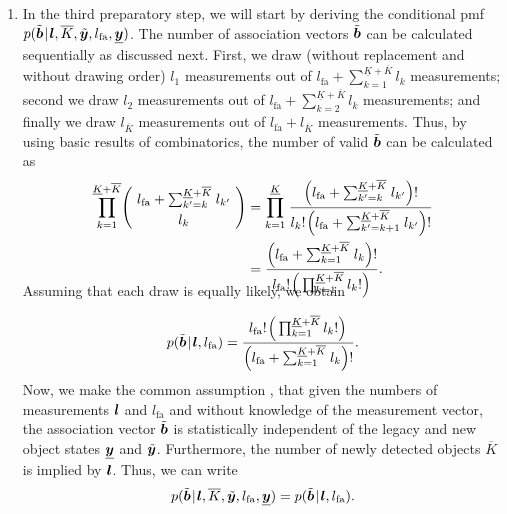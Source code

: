 \documentclass[11pt,a4paper]{article}
\newcommand{\ist}{\hspace*{.3mm}}
\newcommand{\rmv}{\hspace*{-.3mm}}
\newcommand{\nn}{\nonumber}
\begin{document}
\begin{enumerate}
\item In the third preparatory step, we will start by deriving the conditional pmf \vspace{0mm} $p( \tilde{\V{b}} \ist | \ist \V{l}, \overline{K}, \tilde{\V{y}}, l_{\mathrm{fa}},  \underline{\V{y}})$. The number of association vectors $\tilde{\bm{b}}$ can be calculated sequentially as discussed next. First, we draw (without replacement and without drawing order) $l_1$ measurements out of $ l_{\mathrm{fa}} + \sum^{\underline{K} + \overline{K}}_{k=1} l_{k}$ measurements; second we draw $l_2$ measurements out of $ l_{\mathrm{fa}} +  \sum^{\underline{K} + \overline{K}}_{k=2} l_{k}$ measurements; and finally we draw $l_{\overline{K}}$ measurements out of $l_{\mathrm{fa}} + l_{\overline{K}}$ measurements. Thus, by using basic results of combinatorics, the number of \vspace{-.5mm} valid $\tilde{\bm{b}}$ can be calculated as
\begin{align}
\prod^{\underline{K} + \overline{K}}_{k=1} \rmv\rmv \left(\!
    \begin{array}{c}
      l_{\mathrm{fa}}  + \sum^{\underline{K} + \overline{K}}_{k'=k} \ist l_{k'} \\[1mm]
      l_{k} 
    \end{array}
  \!\right) &= \prod^{\underline{K}}_{k=1} \ist \frac{\Big(  l_{\mathrm{fa}}  + \sum^{\underline{K} + \overline{K}}_{k'=k} \ist l_{k'} \Big)!}{l_k!  \ist \Big(l_{\mathrm{fa}}  + \sum^{\underline{K} + \overline{K}}_{k'=k+1} \ist l_{k'}   \Big)!} \nn\\
  &= \frac{\Big( l_{\mathrm{fa}}  + \sum^{\underline{K} + \overline{K}}_{k=1} \ist l_{k}  \Big)!}{l_{\mathrm{fa}}! \ist \Big(\prod^{\underline{K} + \overline{K}}_{k=1} l_{k} ! \Big) \ist }. \nn\\[-8mm]
\end{align}

Assuming that each draw is equally likely, we \vspace{-1mm} obtain

\begin{equation}
p(\tilde{\V{b}} \ist | \ist \V{l},  l_{\mathrm{fa}} ) = \frac{l_{\mathrm{fa}}! \ist \Big(\prod^{\underline{K} + \overline{K}}_{k=1} l_{k} ! \Big) \ist }{\Big( l_{\mathrm{fa}}  + \sum^{\underline{K} + \overline{K}}_{k=1} \ist l_{k}  \Big)!}. \label{eq:condPDF1a}
\vspace{1mm}
\end{equation}
Now, we make the common assumption \cite{MeyKroWilLauHlaBraWin:J18,GraFatSve:J19}, that given the numbers of measurements $\bm{l}$ and $l_{\mathrm{fa}}$ and without knowledge of the measurement vector, the association vector $\tilde{\bm{b}}$ is statistically independent of the legacy and new object states $\underline{\bm{y}}$ and $\tilde{\bm{y}}$. Furthermore, the number of newly detected objects $\overline{K}$ is implied by $\bm{l}$. Thus, we can write
\begin{equation}
p(\tilde{\V{b}} \ist | \ist \V{l}, \overline{K},  \tilde{\V{y}}, l_{\mathrm{fa}},  \underline{\V{y}}) = p(\tilde{\V{b}} \ist | \ist \V{l},  l_{\mathrm{fa}}) .  \label{eq:condPDF1b}
\vspace{1mm}
\end{equation}


\end{enumerate}
\end{document}
